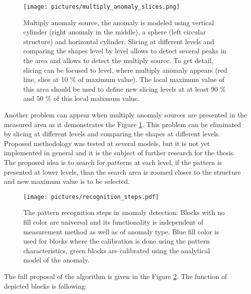 \documentclass[FM]{tulthesis}
\begin{document}
\begin{figure}[ht]
\renewcommand{\figurename}{Figure}
\centerline{\texttt{[image: pictures/multiply\_anomaly\_slices.png]}}
\caption[Anomaly slicing - multiply anomaly sources]{Multiply anomaly source, the anomaly is modeled using vertical cylinder (right anomaly in the middle), a sphere (left circular structure) and horizontal cylinder. Slicing at different levels and comparing the shapes level by level allows to detect several peaks in the area and allows to detect the multiply source. To get detail, slicing can be focused to level, where multiply anomaly appears (red line, slice at 10 \% of maximum value). The local maximum value of this area should be used to define new slicing levels at at least 90 \% and 50 \% of this local maixmum value.}
\label{fig:AnomalySlicingMultiplyAnomaly}
\end{figure}  

Another problem can appear when multiply anomaly sources are presented in the measured area as it demonstrates the Figure \ref{fig:AnomalySlicingMultiplyAnomaly}. This problem can be eliminated by slicing at different levels and comparing the shapes at different levels. Proposed methodology was tested at several models, but it is not yet implemented in general and it is the subject of further research for the thesis. The proposed idea is to search for patterns at each level, if the pattern is presented at lower levels, than the search area is zoomed closer to the structure and new maximum value is to be selected.

\begin{figure}[ht]
\centerline{\texttt{[image: pictures/recognition\_steps.pdf]}}
\renewcommand{\figurename}{Figure}
\caption[The pattern recognition steps]{The pattern recognition steps in anomaly detection: Blocks with no fill color are universal and its functionality is independent of measurement method as well as of anomaly type. Blue fill color is used for blocks where the calibration is done using the pattern characteristics, green blocks are calibrated using the analytical model of the anomaly.}
\label{fig:RecognitionSteps}
\end{figure}

The full proposal of the algorithm is given in the Figure \ref{fig:RecognitionSteps}. The function of depicted blocks is following:
\end{document}
